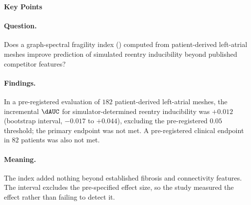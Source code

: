 \noindent\textbf{Key Points}

\paragraph{Question.} Does a graph-spectral fragility index (\SFI) computed from
patient-derived left-atrial meshes improve prediction of simulated reentry
inducibility beyond published competitor features?

\paragraph{Findings.} In a pre-registered evaluation of $182$ patient-derived
left-atrial meshes, the incremental $\dAUC$ for simulator-determined reentry
inducibility was $+0.012$ (bootstrap interval, $-0.017$ to $+0.044$), excluding
the pre-registered $0.05$ threshold; the primary endpoint was not met. A
pre-registered clinical endpoint in $82$ patients was also not met.

\paragraph{Meaning.} The index added nothing beyond established fibrosis and
connectivity features. The interval excludes the pre-specified effect size, so
the study measured the effect rather than failing to detect it.
